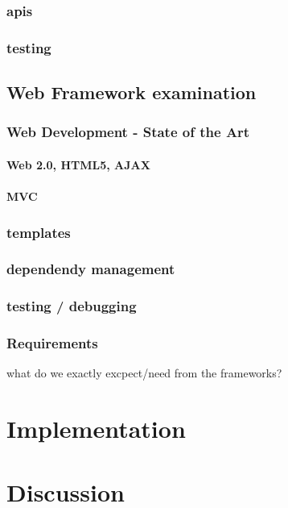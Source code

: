 		\subsection{apis}
		\subsection{testing}
	\section{Web Framework examination}
		\subsection{Web Development - State of the Art}
			\subsubsection{Web 2.0, HTML5, AJAX}				
			\subsubsection{MVC}
			\subsection{templates}
			\subsection{dependendy management}	
			\subsection{testing / debugging}
		\subsection{Requirements} 
		what do we exactly excpect/need from the frameworks? 
		
\chapter{Implementation}

\chapter{Discussion}


\listoffigures
\printbibliography


